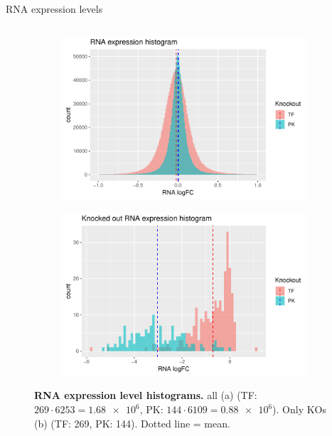 \begin{frame}{RNA expression levels}
\begin{columns}
\begin{column}{0.7\textwidth}
\begin{figure}[ht]
  \centering
  \begin{subfigure}[t]{0.49\textwidth}
  \centering
  \caption{}
  \includegraphics[width=\textwidth]{data/fig/RNA_hist.pdf}
  \label{fig:RNA_hist}
  \end{subfigure}
  \begin{subfigure}[t]{0.49\textwidth}
  \centering
  \caption{}
  \includegraphics[width=\textwidth]{data/fig/knockout_RNA_hist.pdf}
  \label{fig:KO_RNA_hist}
  \end{subfigure}
  \caption{\textbf{RNA expression level histograms.} all (a) (TF: $269\cdot6253=\num{1.68e6}$, PK: $144\cdot6109=\num{0.88e6}$). Only KOs (b) (TF: 269, PK: 144). Dotted line = mean. }
\end{figure}

\end{column}
\end{columns}
\end{frame}
